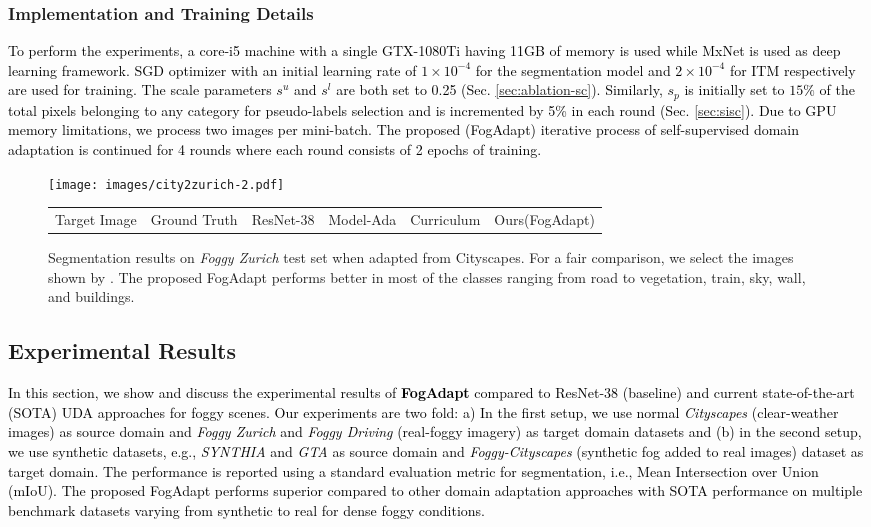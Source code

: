 \documentclass[final,5p,times,twocolumn]{elsarticle}
\begin{document}
\subsubsection{Implementation and Training Details}
\textcolor{black}{
To perform the experiments, a core-i5 machine with a single GTX-1080Ti having 11GB of memory is used while MxNet \cite{mxnet15} is used as deep learning framework. 
SGD optimizer with an initial learning rate of $1 \times 10^{-4}$ for the segmentation model and $2 \times 10^{-4}$ for ITM respectively are used for training. 
\textcolor{black}{The scale parameters $s^u$ and $s^l$ are both set to 0.25 (Sec. \ref{sec:ablation-sc}). }
Similarly, $s_p$ is initially set to $ 15\%$ of the total pixels belonging to any category for pseudo-labels selection and is incremented by 5\% in each round (Sec. \ref{sec:sisc}).
Due to GPU memory limitations, we process two images per mini-batch.
The proposed (FogAdapt) iterative process of self-supervised domain adaptation is continued for 4 rounds where each round consists of 2 epochs of training.}

\begin{figure*}[t]
	\centering
	\texttt{[image: images/city2zurich-2.pdf]}\\
	\footnotesize
	\begin{tabular}{P{1.5cm}P{1.55cm}P{1.7cm}P{1.8cm}P{1.5cm}P{1.5cm}}
    Target Image & Ground Truth & ResNet-38\cite{wu2019Resnet38} &Model-Ada\cite{sakaridis2018model} &Curriculum\cite{dai2019curriculum} & Ours(FogAdapt)
    \end{tabular}
	\caption{Segmentation results on \textit{Foggy Zurich} test set when adapted from Cityscapes. For a fair comparison, we select the images shown by \cite{dai2019curriculum}. The proposed FogAdapt performs better in most of the classes ranging from road to vegetation, train, sky, wall, and buildings.}
	\label{img:city2zurich}
\end{figure*}
\subsection{Experimental Results}
\sloppy
\textcolor{black}{
In this section, we show and discuss the experimental results of \textbf{FogAdapt} compared to ResNet-38 (baseline) and current state-of-the-art (SOTA) UDA approaches for foggy scenes.
Our experiments are two fold: a) In the first setup, we use normal \textit{Cityscapes} (clear-weather images) as source domain and \textit{Foggy Zurich} and \textit{Foggy Driving} (real-foggy imagery) as target domain datasets and (b) in the second setup, we use synthetic datasets, e.g., \textit{SYNTHIA} and \textit{GTA} as source domain and \textit{Foggy-Cityscapes} (synthetic fog added to real images) dataset as target domain.
The performance is reported using a standard evaluation metric for segmentation, i.e.,  Mean Intersection over Union (mIoU). 
The proposed FogAdapt performs superior compared to other domain adaptation approaches with SOTA performance on multiple benchmark datasets varying from synthetic to real for dense foggy conditions.}
\end{document}
